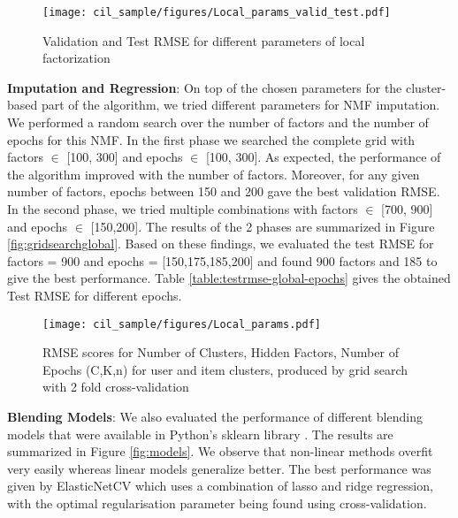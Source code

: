 \documentclass[10pt,conference,compsocconf]{IEEEtran}
\begin{document}
\begin{figure}[H]
  \centering
  \texttt{[image: cil\_sample/figures/Local\_params\_valid\_test.pdf]}
  \caption{Validation and Test RMSE for different parameters of local factorization}
  \label{fig:localtest}
\end{figure}

\textbf{Imputation and Regression}: On top of the chosen parameters for the cluster-based part of the algorithm, we tried different parameters for NMF imputation. We performed a random search over the number of factors and the number of epochs for this NMF. In the first phase we searched the complete grid with factors $\in$ [100, 300] and epochs $\in$ [100, 300]. As expected, the performance of the algorithm improved with the number of factors. Moreover, for any given number of factors, epochs between 150 and 200 gave the best validation RMSE. In the second phase, we tried multiple combinations with factors $\in$ [700, 900] and epochs $\in$ [150,200]. The results of the 2 phases are summarized in Figure \ref{fig:gridsearchglobal}. Based on these findings, we evaluated the test RMSE for factors = 900 and epochs = [150,175,185,200] and found 900 factors and 185 to give the best performance. Table \ref{table:testrmse-global-epochs} gives the obtained Test RMSE for different epochs.


\begin{figure}[H]
  \centering
  \texttt{[image: cil\_sample/figures/Local\_params.pdf]}
  \caption{RMSE scores for Number of Clusters, Hidden Factors, Number of Epochs (C,K,n) for user and item clusters, produced by grid search with 2 fold cross-validation}
  \label{fig:gridsearchlocal}
\end{figure}

\textbf{Blending Models}: We also evaluated the performance of different blending models that were available in Python's sklearn library \cite{sklearn}. The results are summarized in Figure \ref{fig:models}. We observe that non-linear methods overfit very easily whereas linear models generalize better. The best performance was given by ElasticNetCV which uses a combination of lasso and ridge regression, with the optimal regularisation parameter being found using cross-validation.
\end{document}
